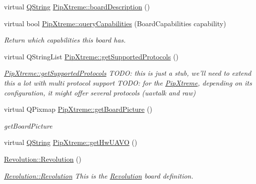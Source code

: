 \begin{DoxyCompactItemize}
\item 
virtual \hyperlink{group___u_a_v_objects_plugin_gab9d252f49c333c94a72f97ce3105a32d}{Q\-String} \hyperlink{group___boards___open_pilot_plugin_ga31e2251cfd285fe24c515d5ee2e53062}{Pip\-Xtreme\-::board\-Description} ()
\item 
virtual bool \hyperlink{group___boards___open_pilot_plugin_ga4cb0d73f85ef11bb262d9d0a94c7b033}{Pip\-Xtreme\-::query\-Capabilities} (Board\-Capabilities capability)
\begin{DoxyCompactList}\small\item\em Return which capabilities this board has. \end{DoxyCompactList}\item 
virtual Q\-String\-List \hyperlink{group___boards___open_pilot_plugin_gac32d0b331396845ce602cc74ff751d83}{Pip\-Xtreme\-::get\-Supported\-Protocols} ()
\begin{DoxyCompactList}\small\item\em \hyperlink{group___boards___open_pilot_plugin_gac32d0b331396845ce602cc74ff751d83}{Pip\-Xtreme\-::get\-Supported\-Protocols} T\-O\-D\-O\-: this is just a stub, we'll need to extend this a lot with multi protocol support T\-O\-D\-O\-: for the \hyperlink{class_pip_xtreme}{Pip\-Xtreme}, depending on its configuration, it might offer several protocols (uavtalk and raw) \end{DoxyCompactList}\item 
virtual Q\-Pixmap \hyperlink{group___boards___open_pilot_plugin_gabfd6ccc67c330f1ffdcfdac97cc864f9}{Pip\-Xtreme\-::get\-Board\-Picture} ()
\begin{DoxyCompactList}\small\item\em get\-Board\-Picture \end{DoxyCompactList}\item 
virtual \hyperlink{group___u_a_v_objects_plugin_gab9d252f49c333c94a72f97ce3105a32d}{Q\-String} \hyperlink{group___boards___open_pilot_plugin_gad8bc1cdc90506b5549224c5c40b835ce}{Pip\-Xtreme\-::get\-Hw\-U\-A\-V\-O} ()
\item 
\hyperlink{group___boards___open_pilot_plugin_gad4ecc2008e08f7c54b4fe92215c77bbb}{Revolution\-::\-Revolution} ()
\begin{DoxyCompactList}\small\item\em \hyperlink{group___boards___open_pilot_plugin_gad4ecc2008e08f7c54b4fe92215c77bbb}{Revolution\-::\-Revolution} This is the \hyperlink{class_revolution}{Revolution} board definition. \end{DoxyCompactList}\item 

\end{DoxyCompactItemize}
